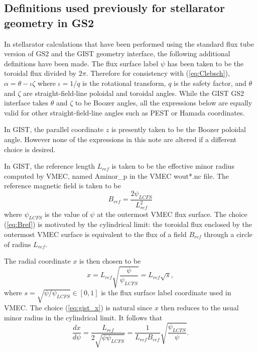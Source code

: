 \documentclass[11pt,letter]{article}
\begin{document}
\subsection{Definitions used previously for stellarator geometry in GS2}

In stellarator calculations that have been performed using the standard flux tube version of GS2
and the GIST geometry interface,
the following additional definitions have been made. 
The flux surface label $\psi$ has been taken to be the toroidal flux divided by $2\pi$.
Therefore for consistency with (\ref{eq:Clebsch}),
$\alpha = \theta - \iota \zeta$ where $\iota = 1/q$ is the rotational transform,
$q$ is the safety factor, and $\theta$ and $\zeta$ are straight-field-line poloidal and toroidal angles.
While the GIST GS2 interface takes $\theta$ and $\zeta$ to be Boozer
angles, all the expressions below are equally valid for other straight-field-line angles such as PEST or Hamada coordinates.

In GIST, the parallel coordinate $z$ is presently taken to be the Boozer poloidal angle. However none of the expressions in this note are altered if a different choice is desired.

In GIST, the reference length $L_{ref}$ is taken to be the effective minor radius computed by VMEC, named Aminor\_p in
the VMEC wout*.nc file.
The reference magnetic field is taken to be
\begin{equation}
B_{ref} = \frac{2 \psi_{LCFS}}{L_{ref}^2}
\label{eq:Bref}
\end{equation}
where $\psi_{LCFS}$ is the value of $\psi$ at the outermost VMEC flux surface. The choice (\ref{eq:Bref}) is
motivated by the cylindrical limit: the toroidal flux enclosed by the outermost VMEC surface is equivalent to the flux of a field $B_{ref}$ through a circle of radius $L_{ref}$.



The radial coordinate $x$ is then chosen to be
\begin{equation}
x = L_{ref} \sqrt{\frac{\psi}{\psi_{LCFS}}} = L_{ref} \sqrt{s},
\label{eq:gist_x}
\end{equation}
where $s = \sqrt{\psi / \psi_{LCFS}} \in [0,1]$ is the flux surface label coordinate
used in VMEC. 
The choice (\ref{eq:gist_x}) is natural since 
$x$ then reduces to the usual minor radius in the cylindrical limit.
It follows that
\begin{equation}
\frac{dx}{d\psi} = \frac{L_{ref}}{2 \sqrt{ \psi \psi_{LCFS}}}
= \frac{1}{L_{ref} B_{ref}} \sqrt{ \frac{\psi_{LCFS}}{\psi}}.
\label{eq:psi_x_conversion}
\end{equation}
\end{document}

